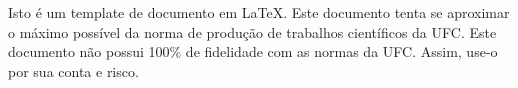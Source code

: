 \begin{resumo}
Isto é um template de documento em \LaTeX. Este documento tenta se
aproximar o máximo possível da norma de produção de trabalhos
científicos da UFC. Este documento não possui 100\% de fidelidade
com as normas da UFC. Assim, use-o por sua conta e risco.

\palavraschave
\end{resumo}
\pagebreak

\begin{abstract}
This is a template document in \LaTeX. This document tries to bring as much
of the production standard of UFC scientific work. This document does not have 
100\% fidelity to the rules of the UFC. So, use it at your own risk.

\keywords
\end{abstract}
